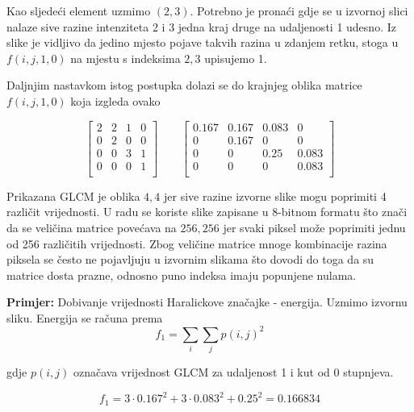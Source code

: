 \documentclass[times, utf8, zavrsni]{fer}
\begin{document}
\bigbreak

Kao sljedeći element uzmimo \((2,3)\).
Potrebno je pronaći gdje se u izvornoj slici nalaze sive razine intenziteta
2 i 3 jedna kraj druge na udaljenosti 1 udesno. Iz slike je vidljivo da 
jedino mjesto pojave takvih razina u zdanjem retku, stoga u \(f(i,j,1,0)\)
na mjestu s indeksima \(2,3\) upisujemo 1. 

\bigbreak
\bigbreak
\bigbreak


\newpage

Daljnjim nastavkom istog postupka
dolazi se do krajnjeg oblika matrice \(f(i,j,1,0)\) koja izgleda ovako

\begin{minipage}{\linewidth}
\centering
\[
\begin{bmatrix}
2&2&1&0\\
0&2&0&0\\
0&0&3&1\\
0&0&0&1\\
\end{bmatrix}
\quad
\quad
\begin{bmatrix}
0.167&0.167&0.083&0\\
0&0.167&0&0\\
0&0&0.25&0.083\\
0&0&0&0.083\\
\end{bmatrix}
\]
\end{minipage}

\bigbreak

Prikazana GLCM je oblika \(4,4\) jer sive razine izvorne slike mogu poprimiti
4 različit vrijednosti. U radu se koriste slike zapisane u 8-bitnom formatu
što znači da se veličina matrice povećava na \(256,256\) jer svaki piksel može
poprimiti jednu od 256 različitih vrijednosti. Zbog veličine matrice mnoge
kombinacije razina piksela se često ne pojavljuju u izvornim slikama što
dovodi do toga da su matrice dosta prazne, odnosno puno indeksa imaju popunjene 
nulama.

\bigbreak

\textbf{Primjer:} Dobivanje vrijednosti Haralickove značajke - energija. Uzmimo izvornu sliku.
Energija se računa prema
\[
f_1 = \sum_{i}\sum_{j}p(i,j)^2
\]

gdje \(p(i,j)\) označava vrijednost GLCM za udaljenost 1 i kut od 0 stupnjeva.

\[
f_1 = 3 \cdot 0.167^2 + 3 \cdot 0.083^2 + 0.25^2 = 0.166834
\]
\end{document}
